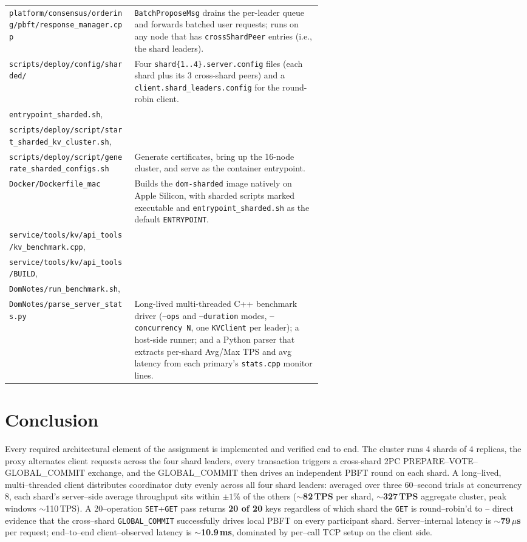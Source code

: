 \documentclass[11pt]{article}
\begin{document}
\begin{tabular}{lp{0.6\linewidth}}
  \texttt{platform/consensus/ordering/pbft/response\_manager.cpp}
    & \texttt{BatchProposeMsg} drains the per-leader queue and forwards batched user requests; runs on any node that has \texttt{crossShardPeer} entries (i.e., the shard leaders). \\
  \texttt{scripts/deploy/config/sharded/}
    & Four \texttt{shard\{1..4\}.server.config} files (each shard plus its 3 cross-shard peers) and a \texttt{client.shard\_leaders.config} for the round-robin client. \\
  \texttt{entrypoint\_sharded.sh}, \\
  \texttt{scripts/deploy/script/start\_sharded\_kv\_cluster.sh}, \\
  \texttt{scripts/deploy/script/generate\_sharded\_configs.sh}
    & Generate certificates, bring up the 16-node cluster, and serve as the container entrypoint. \\
  \texttt{Docker/Dockerfile\_mac}
    & Builds the \texttt{dom-sharded} image natively on Apple Silicon, with sharded scripts marked executable and \texttt{entrypoint\_sharded.sh} as the default \texttt{ENTRYPOINT}. \\
  \texttt{service/tools/kv/api\_tools/kv\_benchmark.cpp},\\
  \texttt{service/tools/kv/api\_tools/BUILD},\\
  \texttt{DomNotes/run\_benchmark.sh},\\
  \texttt{DomNotes/parse\_server\_stats.py}
    & Long-lived multi-threaded C++ benchmark driver (\texttt{--ops} and \texttt{--duration} modes, \texttt{--concurrency N}, one \texttt{KVClient} per leader); a host-side runner; and a Python parser that extracts per-shard Avg/Max TPS and avg latency from each primary's \texttt{stats.cpp} monitor lines. \\
  \bottomrule
\end{tabular}

\section{Conclusion}

Every required architectural element of the assignment is implemented and
verified end to end. The cluster runs 4 shards of 4 replicas, the proxy
alternates client requests across the four shard leaders, every
transaction triggers a cross-shard 2PC PREPARE--VOTE--GLOBAL\_COMMIT
exchange, and the GLOBAL\_COMMIT then drives an independent PBFT round on
each shard. A long--lived, multi--threaded client distributes coordinator duty
evenly across all four shard leaders: averaged over three 60--second
trials at concurrency 8, each shard's server--side average throughput
sits within $\pm 1$\% of the others
($\sim$\textbf{82\,TPS} per shard, \textbf{$\sim$327\,TPS} aggregate
cluster, peak windows $\sim$110\,TPS). A 20--operation
\texttt{SET}+\texttt{GET} pass returns \textbf{20 of 20} keys
regardless of which shard the \texttt{GET} is round--robin'd to --
direct evidence that the cross--shard \texttt{GLOBAL\_COMMIT}
successfully drives local PBFT on every participant shard.
Server--internal latency is $\sim$\textbf{79\,$\mu$s} per request;
end--to--end client--observed latency is $\sim$\textbf{10.9\,ms},
dominated by per--call TCP setup on the client side.
\end{document}

